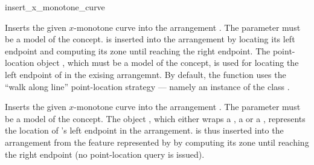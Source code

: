 
\ccRefPageBegin

\begin{ccRefFunction}{insert_x_monotone_curve}


   {Inserts the given $x$-monotone curve  into the arrangement
    . The  parameter must be a model of the
     concept.  is inserted
    into the arrangement by locating its left endpoint and computing its
    zone until reaching the right endpoint.
    The point-location object , which must be a model of the
     concept, is used for locating the
    left endpoint of  in the exising arrangemnt.
    By default, the function uses the ``walk along line'' point-location
    strategy --- namely an instance of the class
    .
    }


   {Inserts the given $x$-monotone curve  into the arrangement
    . The  parameter must be a model of the
     concept. The object , which
    either wraps a , a 
    or a , represents the location of 's left
    endpoint in the arrangement.  is thus inserted
    into the arrangement from the feature represented by  by
    computing its zone until reaching the right endpoint (no point-location
    query is issued).}

\end{ccRefFunction}

\ccRefPageEnd

